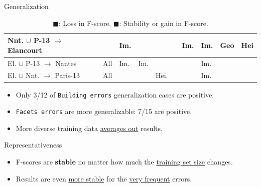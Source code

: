 \documentclass[10pt, export]{beamer}
\begin{document}
\begin{frame}{Generalization}
{\begin{table}
\begin{center}
\begin{tabular}{| x{1.5cm}| x{.4cm} | x{.4cm} | x{.4cm} | x{.4cm} | x{.4cm} | x{.4cm} | x{.4cm} | x{.4cm} | x{.4cm} |}
                            \hline
                            Nnt. $\cup$ P-13 $\rightarrow$ Elancourt & & Im.& & & &Im. &Im. &Geo &  Hei\\
                            \hline
                            El. $\cup$ P-13 $\rightarrow$ Nantes   & All& Im.&Im. & & & & Im.&  &\\
                            \hline
                            El. $\cup$ Nnt. $\rightarrow$ Paris-13   &All & &  &Hei. & & &Im. &  &\\
                            \hline
                        \end{tabular}
                        \caption{\footnotesize \textcolor{IGNRed}{$\blacksquare$}: Loss in F-score, \textcolor{IGNGreen}{$\blacksquare$}: Stability or gain in F-score.}
                    \end{center}
                \end{table}
                \begin{itemize}[label=$\blacktriangleright$, font=\color{IGNGreen}]
                    \item<2-> \footnotesize Only 3/12 of \texttt{Building errors} generalization cases are \textcolor{IGNGreen}{positive}.
                    \item<3-> \footnotesize \texttt{Facets errors} are more generalizable: 7/15 are \textcolor{IGNGreen}{positive}.
                    \item<4-> \footnotesize More diverse training data \underline{averages out} results.
                \end{itemize}
            }
        \end{frame}
        \begin{frame}{Representativeness}
            \begin{figure}
                
            \end{figure}
            \begin{itemize}[label=$\blacktriangleright$, font=\color{IGNGreen}]
                \item<2-> \footnotesize F-scores are \textbf{stable} no matter how much the \underline{training set size} changes.
                \item<3-> \footnotesize Results are even \underline{more stable} for the \underline{very frequent} errors.
            \end{itemize}
        \end{frame}
\end{document}

